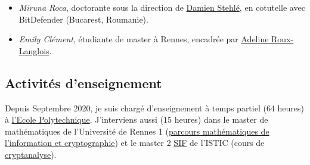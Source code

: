 \documentclass[11pt]{article}
\newcommand{\cs}{\cb{s}}
\begin{document}
    \begin{itemize}
    \item  {\em Miruna Ro\cs ca}, doctorante sous la direction de \href{http://perso.ens-lyon.fr/damien.stehle/}{Damien Stehlé}, en cotutelle avec BitDefender (Bucarest, Roumanie).
    \item {\em Emily Clément}, étudiante de master à Rennes, encadrée par \href{https://langloi227.users.greyc.fr/}{Adeline Roux-Langlois}.
    \end{itemize}
    
    \subsection*{Activités d'enseignement}

    Depuis Septembre 2020, je suis chargé d'enseignement à temps partiel (64 heures) à \href{https://www.polytechnique.edu/}{l'Ecole Polytechnique}.
    J'interviens aussi (15 heures) dans le master de mathématiques de l'Université de Rennes 1 (\href{https://math.univ-rennes1.fr/parcours-mathematiques-de-linformation-cryptographie-master}{parcours mathématiques de l'information et cryptographie}) et le master 2 \href{http://master.irisa.fr/}{SIF} de l'ISTIC (cours de \href{http://master.irisa.fr/courses/CRA.html}{cryptanalyse}). 


  
\end{document}
